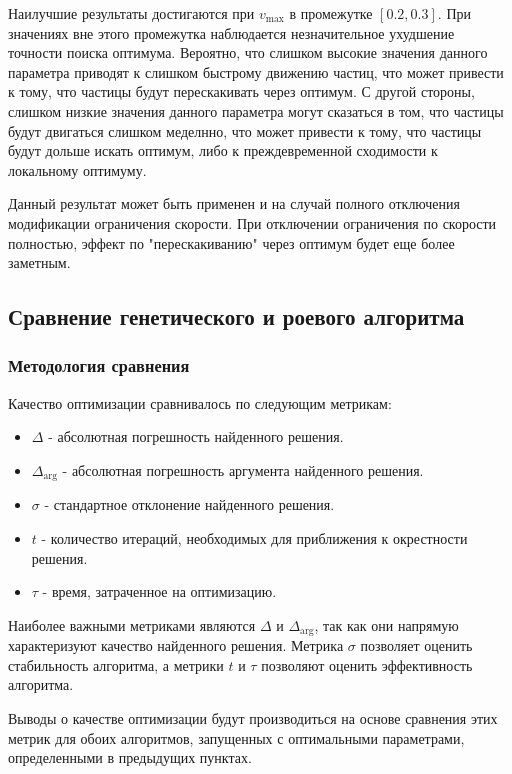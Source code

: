 \documentclass[12pt,a4paper]{article}
\begin{document}
Наилучшие результаты достигаются при \(v_{\max}\) в промежутке \([0.2, 0.3]\). При значениях вне этого промежутка наблюдается
незначительное ухудшение точности поиска оптимума. Вероятно, что слишком высокие значения
данного параметра приводят к слишком быстрому движению частиц, что может привести к тому,
что частицы будут перескакивать через оптимум. С другой стороны, слишком низкие значения данного
параметра могут сказаться в том, что частицы будут двигаться слишком меделнно, что может привести к тому,
что частицы будут дольше искать оптимум, либо к преждевременной сходимости к локальному оптимуму.

Данный результат может быть применен и на случай полного отключения модификации ограничения скорости.
При отключении ограничения по скорости полностью, эффект по "перескакиванию" через оптимум будет еще более заметным.

\subsection{Сравнение генетического и роевого алгоритма}
\subsubsection{Методология сравнения}
Качество оптимизации сравнивалось по следующим метрикам:
\begin{itemize}
    \item \(\Delta\) - абсолютная погрешность найденного решения.
    \item \(\Delta_{\arg}\) - абсолютная погрешность аргумента найденного решения.
    \item \(\sigma\) - стандартное отклонение найденного решения.
    \item \(t\) - количество итераций, необходимых для приближения к окрестности решения.
    \item \(\tau\) - время, затраченное на оптимизацию.
\end{itemize}

Наиболее важными метриками являются \(\Delta\) и \(\Delta_{\arg}\),
так как они напрямую характеризуют качество найденного решения.
Метрика \(\sigma\) позволяет оценить стабильность алгоритма,
а метрики \(t\) и \(\tau\) позволяют оценить эффективность алгоритма.

Выводы о качестве оптимизации будут производиться на основе сравнения этих метрик для обоих алгоритмов, 
запущенных с оптимальными параметрами, определенными в предыдущих пунктах.
\end{document}
